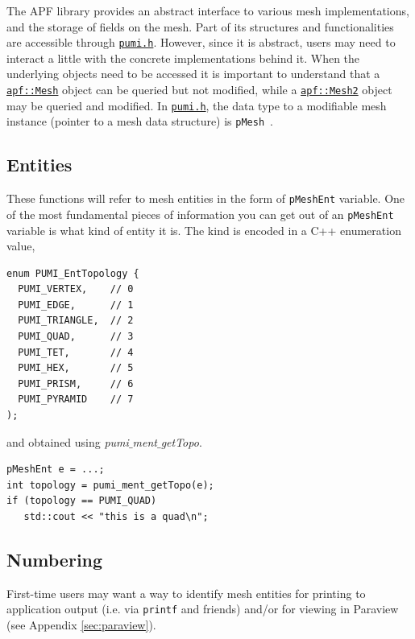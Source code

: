 \documentclass{article}
\begin{document}
The APF library provides an abstract interface to various mesh
implementations, and the storage of fields on the mesh.
Part of its structures and functionalities are accessible through
\href{https://github.com/SCOREC/core/blob/master/pumi/pumi.h}{\texttt{pumi.h}}.
However, since it is abstract, users may need to interact a little with the
concrete implementations behind it.
When the underlying objects need to be accessed it is important to understand
that a
\href{http://scorec.rpi.edu/~dibanez/core/classapf_1_1Mesh.html}{\texttt{apf::Mesh}}
object can be queried but not modified, while a
\href{http://scorec.rpi.edu/~dibanez/core/classapf_1_1Mesh2.html}{\texttt{apf::Mesh2}}
object may be queried and modified.
In \href{https://github.com/SCOREC/core/blob/master/pumi/pumi.h}{\texttt{pumi.h}},
the data type to a modifiable mesh instance (pointer to a mesh data structure)
is \texttt{pMesh}~.

\subsection{Entities}

These functions will refer to mesh entities in the
form of \texttt{pMeshEnt} variable.
One of the most fundamental pieces of information you can get
out of an \texttt{pMeshEnt} variable is what kind of
entity it is.
The kind is encoded in a C++ enumeration value,
\begin{lstlisting}
enum PUMI_EntTopology {
  PUMI_VERTEX,    // 0
  PUMI_EDGE,      // 1
  PUMI_TRIANGLE,  // 2
  PUMI_QUAD,      // 3
  PUMI_TET,       // 4
  PUMI_HEX,       // 5
  PUMI_PRISM,     // 6
  PUMI_PYRAMID    // 7
);
\end{lstlisting}

and obtained using \emph{pumi$\_$ment$\_$getTopo}.

\begin{lstlisting}
pMeshEnt e = ...;
int topology = pumi_ment_getTopo(e);
if (topology == PUMI_QUAD)
   std::cout << "this is a quad\n";
\end{lstlisting}

\subsection{Numbering}
\label{sec:num}

First-time users may want a way to identify mesh entities for
printing to application output (i.e. via \texttt{printf} and friends)
and/or for viewing in Paraview (see Appendix \ref{sec:paraview}).
\end{document}
